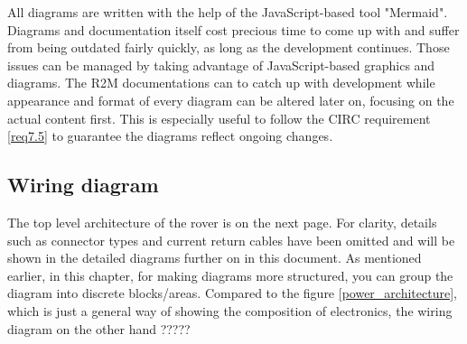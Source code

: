     \vspace{5mm} %

    All diagrams are written with the help of the JavaScript-based tool "Mermaid". Diagrams and documentation itself cost precious time to come up with and suffer from being outdated fairly quickly, as long as the development continues. Those issues can be managed by taking advantage of JavaScript-based graphics and diagrams. The R2M documentations can to catch up with development while appearance and format of every diagram can be altered later on, focusing on the actual content first. This is especially useful to follow the CIRC requirement \ref{req7.5} to guarantee the diagrams reflect ongoing changes.

    \clearpage %

    \subsection{Wiring diagram}

    The top level architecture of the rover is on the next page. For clarity, details such as connector types and current return cables have been omitted and will be shown in the detailed diagrams further on in this document. As mentioned earlier, in this chapter, for making diagrams more structured, you can group the diagram into discrete blocks/areas. Compared to the figure \ref{power_architecture}, which is just a general way of showing the composition of electronics, the wiring diagram on the other hand ?????

